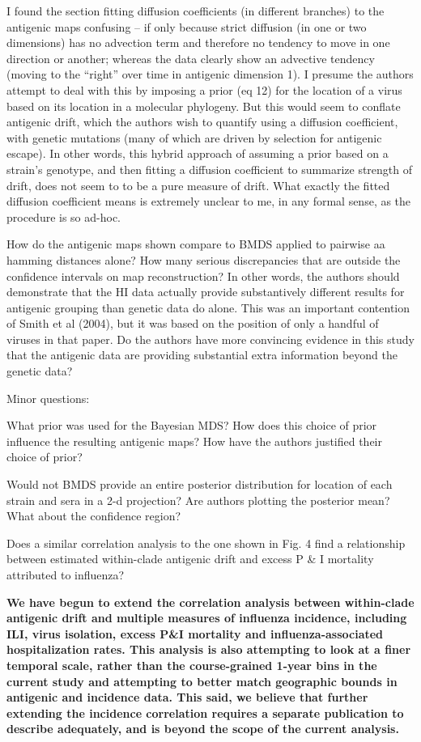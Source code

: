 \documentclass[11pt,oneside,letterpaper]{article}
\begin{document}
I found the section fitting diffusion coefficients (in different branches) to the antigenic maps confusing -- if only because strict diffusion (in one or two dimensions) has no advection term and therefore no tendency to move in one direction or another; whereas the data clearly show an advective tendency (moving to the ``right'' over time in antigenic dimension 1). I presume the authors attempt to deal with this by imposing a prior (eq 12) for the location of a virus based on its location in a molecular phylogeny. But this would seem to conflate antigenic drift, which the authors wish to quantify using a diffusion coefficient, with genetic mutations (many of which are driven by selection for antigenic escape). In other words, this hybrid approach of assuming a prior based on a strain's genotype, and then fitting a diffusion coefficient to summarize strength of drift, does not seem to to be a pure measure of drift. What exactly the fitted diffusion coefficient means is extremely unclear to me, in any formal sense, as the procedure is so ad-hoc.

How do the antigenic maps shown compare to BMDS applied to pairwise aa hamming distances alone? How many serious discrepancies that are outside the confidence intervals on map reconstruction? In other words, the authors should demonstrate that the HI data actually provide substantively different results for antigenic grouping than genetic data do alone. This was an important contention of Smith et al (2004), but it was based on the position of only a handful of viruses in that paper. Do the authors have more convincing evidence in this study that the antigenic data are providing substantial extra information beyond the genetic data?

Minor questions:

What prior was used for the Bayesian MDS? How does this choice of prior influence the resulting antigenic maps? How have the authors justified their choice of prior?

Would not BMDS provide an entire posterior distribution for location of each strain and sera in a 2-d projection? Are authors plotting the posterior mean? What about the confidence region?

Does a similar correlation analysis to the one shown in Fig. 4 find a relationship between estimated within-clade antigenic drift and excess P \& I mortality attributed to influenza?

\textbf{We have begun to extend the correlation analysis between within-clade antigenic drift and multiple measures of influenza incidence, including ILI, virus isolation, excess P\&I mortality and influenza-associated hospitalization rates. This analysis is also attempting to look at a finer temporal scale, rather than the course-grained 1-year bins in the current study and attempting to better match geographic bounds in antigenic and incidence data.  This said, we believe that further extending the incidence correlation requires a separate publication to  describe adequately, and is beyond the scope of the current analysis.}
\end{document}
